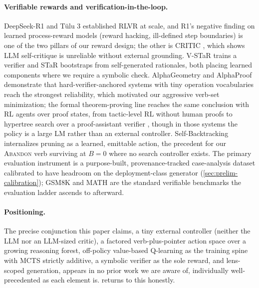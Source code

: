 \paragraph{Verifiable rewards and verification-in-the-loop.}
DeepSeek-R1 \citep{deepseekr1} and T\"ulu 3 \citep{tulu3} established
RLVR at scale, and R1's negative finding on learned process-reward models
(reward hacking, ill-defined step boundaries) is one of the two pillars of
our reward design; the other is CRITIC \citep{critic}, which shows LLM
self-critique is unreliable without external grounding. V-STaR
\citep{vstar} trains a verifier and STaR \citep{star} bootstraps from
self-generated rationales, both placing learned components where we require
a symbolic check. AlphaGeometry \citep{alphageometry} and AlphaProof
\citep{alphaproof} demonstrate that hard-verifier-anchored systems with
tiny operation vocabularies reach the strongest reliability, which
motivated our aggressive verb-set minimization; the formal theorem-proving
line reaches the same conclusion with RL agents over proof states, from
tactic-level RL without human proofs \citep{tacticzero} to hypertree
search over a proof-assistant verifier \citep{htps}, though in those
systems the policy is a large LM rather than an external controller.
Self-Backtracking \citep{selfbacktrack}
internalizes pruning as a learned, emittable action, the precedent for our
\textsc{Abandon} verb surviving at $B{=}0$ where no search controller
exists. The primary evaluation instrument is a purpose-built,
provenance-tracked case-analysis dataset calibrated to have headroom on
the deployment-class generator (\cref{sec:prelim-calibration}); GSM8K
\citep{gsm8k} and MATH \citep{math} are the standard verifiable
benchmarks the evaluation ladder ascends to afterward.

\paragraph{Positioning.} The precise conjunction this paper claims, a tiny
external controller (neither the LLM nor an LLM-sized critic), a factored
verb-plus-pointer action space over a growing reasoning forest, off-policy
value-based Q-learning as the training spine with MCTS strictly additive, a
symbolic verifier as the sole reward, and lens-scoped generation, appears in
no prior work we are aware of, individually well-precedented as each element
is.  returns to this honestly.
